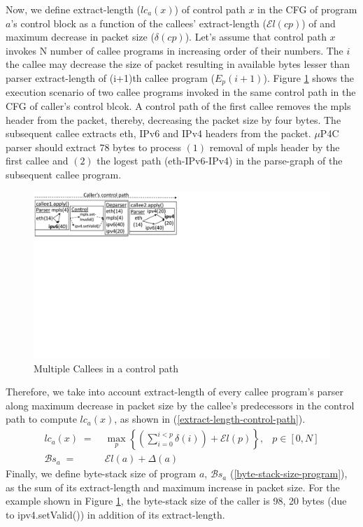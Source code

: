 Now, we define extract-length ($lc_{a}(x)$) of control path $x$ in the CFG of program $a$'s control block as a function of the callees' extract-length ($\mathcal{E}l(cp)$) of and maximum decrease in packet size ($\delta(cp)$).
Let's assume that control path $x$ invokes N number of callee programs in increasing order of their numbers. 
The $i$the callee may decrease the size of packet resulting in available bytes lesser than parser extract-length of (i+1)th callee program ($E_{p}(i+1)$).
Figure \ref{fig:sequential-callees} shows the execution scenario of two callee programs invoked in the same control path in the CFG of caller's control blcok.
A control path of the first callee removes the mpls header from the packet, thereby, decreasing the packet size by four bytes.
The subsequent callee extracts eth, IPv6 and IPv4 headers from the packet.
$\mu$P4C parser should extract 78 bytes to process $(1)$ removal of mpls header by the first callee and $(2)$ the logest path (eth-IPv6-IPv4) in the parse-graph of the subsequent callee program.
\begin{figure}
    \centering
    \includegraphics[trim=0 396 487 0, clip,scale=0.5]{sequential-callees}
    \caption{Multiple Callees in a control path}
    \label{fig:sequential-callees}
\end{figure}
Therefore, we take into account extract-length of every callee program's parser along maximum decrease in packet size by the callee's predecessors in the control path to compute $lc_{a}(x)$, as shown in (\ref{extract-length-control-path}).
\begin{align}
lc_{a}(x) \; =& \; \max_{p} \left\{ \left( \sum_{i=0}^{i<p} \delta(i) \right)+ \mathcal{E}l(p) \right\},&p \in [0,N] \label{extract-length-control-path} \\
\mathcal{B}s_{a} \; =& \; \mathcal{E}l(a) + \Delta(a) & \label{byte-stack-size-program}
\end{align}
Finally, we define byte-stack size of program $a$, $\mathcal{B}s_{a}$ (\ref{byte-stack-size-program}), as the sum of its extract-length and maximum increase in packet size.
For the example shown in Figure \ref{fig:sequential-callees}, the byte-stack size of the caller is 98, 20 bytes (due to ipv4.setValid()) in addition of its extract-length.


